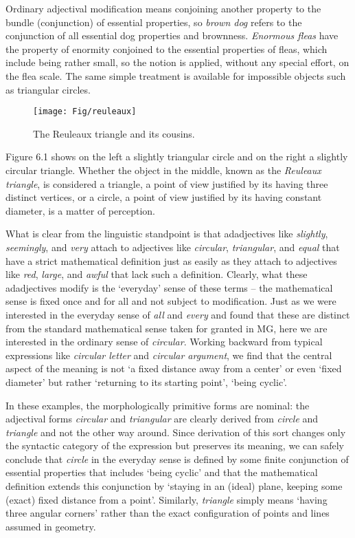 Ordinary adjectival modification means conjoining another property to the
bundle (conjunction) of essential properties, so {\it brown dog} refers to the
conjunction of all essential dog properties and brownness. {\it Enormous
fleas} have the property of enormity conjoined to the essential properties of
fleas, which include being rather small, so the notion is applied, without any
special effort, on the flea scale. The same simple treatment is available for
impossible objects such as triangular circles. 

\begin{figure}[hH]
\begin{center}
\texttt{[image: Fig/reuleaux]}
\end{center}
\caption{The Reuleaux triangle and its cousins.}
\end{figure}

Figure 6.1 shows on the left a slightly triangular circle and on the right 
a slightly circular triangle. Whether the object in the middle, known as the  
{\it Reuleaux triangle}, is considered a triangle, a point of view justified
by its having three distinct vertices, or a circle, a point of view justified
by its having constant diameter, is a matter of perception.

What is clear from the linguistic standpoint is that adadjectives like {\it
  slightly}, {\it seemingly}, and {\it very} attach to adjectives like {\it
  circular}, {\it triangular}, and {\it equal} that have a strict mathematical
definition just as easily as they attach to adjectives like {\it red}, {\it
  large}, and {\it awful} that lack such a definition. Clearly, what these
adadjectives modify is the `everyday' sense of these terms -- the mathematical
sense is fixed once and for all and not subject to modification. Just as we
were interested in the everyday sense of {\it all} and {\it every} and found
that these are distinct from the standard mathematical sense taken for granted
in MG, here we are interested in the ordinary sense of {\it circular}. Working
backward from typical expressions like {\it circular letter} and {\it circular
  argument}, we find that the central aspect of the meaning is not `a fixed
distance away from a center' or even `fixed diameter' but rather `returning
to its starting point', `being cyclic'.

In these examples, the morphologically primitive forms are nominal: the
adjectival forms {\it circular} and {\it triangular} are clearly derived from
{\it circle} and {\it triangle} and not the other way around. Since derivation
of this sort changes only the syntactic category of the expression but
preserves its meaning, we can safely conclude that {\it circle} in the
everyday sense is defined by some finite conjunction of essential properties
that includes `being cyclic' and that the mathematical definition extends this
conjunction by `staying in an (ideal) plane, keeping some (exact) fixed
distance from a point'. Similarly, {\it triangle} simply means `having three
angular corners' rather than the exact configuration of points and lines
assumed in geometry.

